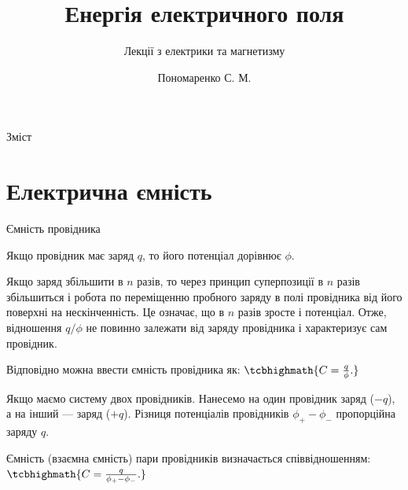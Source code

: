 \documentclass[onlytextwidth]{beamer}
\title[Лекції електрики та магнетизму]{\huge\bfseries Енергія електричного поля}
\subtitle{Лекції з електрики та магнетизму}
\author{Пономаренко С. М.}
\date{}
\begin{document}
\begin{frame}[plain]
	\maketitle
\end{frame}

\begin{frame}{Зміст}{}
	\tableofcontents
\end{frame}



\section{Електрична ємність}

\begin{frame}{Ємність провідника}{}
	\begin{block}{}\justifying
		Якщо провідник має заряд $q$, то його потенціал дорівнює $\phi$.

		\medskip

		Якщо заряд збільшити в $n$ разів, то через принцип суперпозиції в $n$ разів збільшиться і
		робота по переміщенню пробного заряду в полі провідника від його поверхні на нескінченність. Це
		означає, що в $n$ разів зросте і потенціал. Отже, відношення $q/\phi$ не повинно залежати від
		заряду провідника і характеризує сам провідник.

		\medskip

		Відповідно можна ввести \alert{ємність провідника} як: $\tcbhighmath{C= \frac{q}{\phi}.}$
	\end{block}

	\begin{block}{}\justifying
		Якщо маємо систему двох провідників. Нанесемо на один провідник заряд ($-q$), а на інший --- заряд
		($+q$). Різниця потенціалів провідників $\phi_+ - \phi_-$ пропорційна заряду $q$.

		\bigskip

		Ємність (\alert{взаємна ємність}) пари провідників визначається співвідношенням:
		$\tcbhighmath{C=
				\frac{q}{\phi_+ - \phi_-}.}$
	\end{block}
\end{frame}
\end{document}

